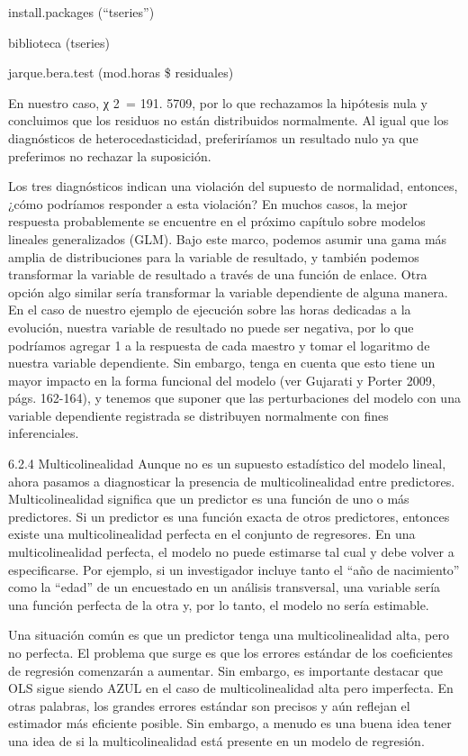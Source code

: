 \documentclass[
]{book}
\begin{document}
install.packages (``tseries'')

biblioteca (tseries)

jarque.bera.test (mod.horas \$ residuales)

En nuestro caso, χ 2  = 191. 5709, por lo que rechazamos la hipótesis nula y concluimos que los residuos no están distribuidos normalmente. Al igual que los diagnósticos de heterocedasticidad, preferiríamos un resultado nulo ya que preferimos no rechazar la suposición.

Los tres diagnósticos indican una violación del supuesto de normalidad, entonces, ¿cómo podríamos responder a esta violación? En muchos casos, la mejor respuesta probablemente se encuentre en el próximo capítulo sobre modelos lineales generalizados (GLM). Bajo este marco, podemos asumir una gama más amplia de distribuciones para la variable de resultado, y también podemos transformar la variable de resultado a través de una función de enlace. Otra opción algo similar sería transformar la variable dependiente de alguna manera. En el caso de nuestro ejemplo de ejecución sobre las horas dedicadas a la evolución, nuestra variable de resultado no puede ser negativa, por lo que podríamos agregar 1 a la respuesta de cada maestro y tomar el logaritmo de nuestra variable dependiente. Sin embargo, tenga en cuenta que esto tiene un mayor impacto en la forma funcional del modelo (ver Gujarati y Porter 2009, págs. 162-164), y tenemos que suponer que las perturbaciones del modelo con una variable dependiente registrada se distribuyen normalmente con fines inferenciales.

6.2.4 Multicolinealidad
Aunque no es un supuesto estadístico del modelo lineal, ahora pasamos a diagnosticar la presencia de multicolinealidad entre predictores. Multicolinealidad significa que un predictor es una función de uno o más predictores. Si un predictor es una función exacta de otros predictores, entonces existe una multicolinealidad perfecta en el conjunto de regresores. En una multicolinealidad perfecta, el modelo no puede estimarse tal cual y debe volver a especificarse. Por ejemplo, si un investigador incluye tanto el ``año de nacimiento'' como la ``edad'' de un encuestado en un análisis transversal, una variable sería una función perfecta de la otra y, por lo tanto, el modelo no sería estimable.

Una situación común es que un predictor tenga una multicolinealidad alta, pero no perfecta. El problema que surge es que los errores estándar de los coeficientes de regresión comenzarán a aumentar. Sin embargo, es importante destacar que OLS sigue siendo AZUL en el caso de multicolinealidad alta pero imperfecta. En otras palabras, los grandes errores estándar son precisos y aún reflejan el estimador más eficiente posible. Sin embargo, a menudo es una buena idea tener una idea de si la multicolinealidad está presente en un modelo de regresión.
\end{document}
